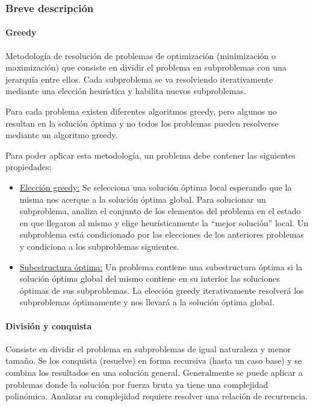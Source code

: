 \documentclass[../tp2_grupo404.tex]{subfiles}
\begin{document}
\subsubsection{Breve descripción}

\paragraph{Greedy}
Metodología de resolución de problemas de optimización
(minimización o maximización) que consiste en dividir el problema en
subproblemas con una jerarquía entre ellos. Cada subproblema se va
resolviendo iterativamente mediante una elección heurística y habilita
nuevos subproblemas.
\par Para cada problema existen diferentes algoritmos greedy, pero
algunos no resultan en la solución óptima y no todos los problemas
pueden resolverse mediante un algoritmo greedy.
\par Para poder aplicar esta metodología, un problema debe contener
las siguientes propiedades:
\begin{itemize}
    \item \underline{Elección greedy:} Se selecciona una solución óptima local
    esperando que la misma nos acerque a la solución óptima global.
    Para solucionar un subproblema, analiza el conjunto de los elementos
    del problema en el estado en que llegaron al mismo y elige
    heurísticamente la “mejor solución” local. Un subproblema está
    condicionado por las elecciones de los anteriores problemas y
    condiciona a los subproblemas siguientes.

    \item \underline{Subestructura óptima:} Un problema contiene una subestructura
    óptima si la solución óptima global del mismo contiene en su
    interior las soluciones óptimas de sus subproblemas. La elección
    greedy iterativamente resolverá los subproblemas óptimamente y nos
    llevará a la solución óptima global.

\end{itemize}

\paragraph{División y conquista}
Consiste en dividir el problema en
subproblemas de igual naturaleza y menor tamaño. Se los conquista
(resuelve) en forma recursiva (hasta un caso base) y se combina los
resultados en una solución general. Generalmente se puede aplicar a
problemas donde la solución por fuerza bruta ya tiene una complejidad
polinómica. Analizar su complejidad requiere resolver una relación de
recurrencia.
\end{document}
